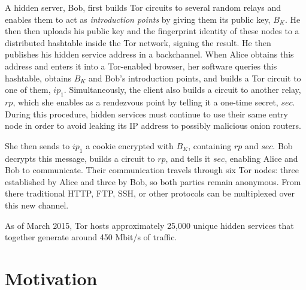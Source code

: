 A hidden server, Bob, first builds Tor circuits to several random relays and enables them to act as \textit{introduction points} by giving them its public key, $ B_{K} $. He then then uploads his public key and the fingerprint identity of these nodes to a distributed hashtable inside the Tor network, signing the result. He then publishes his hidden service address in a backchannel. When Alice obtains this address and enters it into a Tor-enabled browser, her software queries this hashtable, obtains $ B_{K} $ and Bob's introduction points, and builds a Tor circuit to one of them, $ ip_{1} $. Simultaneously, the client also builds a circuit to another relay, $ rp $, which she enables as a rendezvous point by telling it a one-time secret, $ sec $. During this procedure, hidden services must continue to use their same entry node in order to avoid leaking its IP address to possibly malicious onion routers.\cite{bauer2007low}\cite{overlier2006locating}


She then sends to $ ip_{1} $ a cookie encrypted with $ B_{K} $, containing $ rp $ and $ sec $. Bob decrypts this message, builds a circuit to $ rp $, and tells it $ sec $, enabling Alice and Bob to communicate. Their communication travels through six Tor nodes: three established by Alice and three by Bob, so both parties remain anonymous. From there traditional HTTP, FTP, SSH, or other protocols can be multiplexed over this new channel.

As of March 2015, Tor hosts approximately 25,000 unique hidden services that together generate around 450 Mbit/s of traffic.\cite{TorMetrics}

\section{Motivation}
\label{sec:Motivation}

